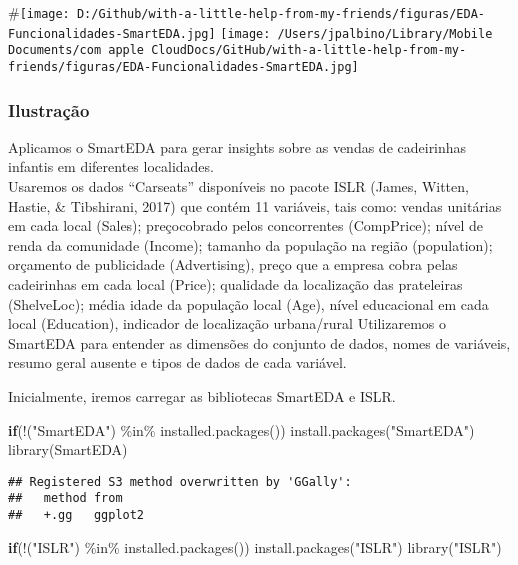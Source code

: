 \documentclass[
]{article}
\newenvironment{Shaded}{\begin{snugshade}}{\end{snugshade}}
\newcommand{\ControlFlowTok}[1]{\textcolor[rgb]{0.13,0.29,0.53}{\textbf{#1}}}
\newcommand{\FunctionTok}[1]{\textcolor[rgb]{0.00,0.00,0.00}{#1}}
\newcommand{\NormalTok}[1]{#1}
\newcommand{\SpecialCharTok}[1]{\textcolor[rgb]{0.00,0.00,0.00}{#1}}
\newcommand{\StringTok}[1]{\textcolor[rgb]{0.31,0.60,0.02}{#1}}
\begin{document}
\#\texttt{[image: D:/Github/with-a-little-help-from-my-friends/figuras/EDA-Funcionalidades-SmartEDA.jpg]}
\texttt{[image: /Users/jpalbino/Library/Mobile Documents/com~apple~CloudDocs/GitHub/with-a-little-help-from-my-friends/figuras/EDA-Funcionalidades-SmartEDA.jpg]}

\hypertarget{ilustrauxe7uxe3o}{%
\subsubsection{Ilustração}\label{ilustrauxe7uxe3o}}

Aplicamos o SmartEDA para gerar insights sobre as vendas de cadeirinhas
infantis em diferentes localidades.\\
Usaremos os dados ``Carseats'' disponíveis no pacote ISLR (James,
Witten, Hastie, \& Tibshirani, 2017) que contém 11 variáveis, tais como:
vendas unitárias em cada local (Sales); preçocobrado pelos concorrentes
(CompPrice); nível de renda da comunidade (Income); tamanho da população
na região (population); orçamento de publicidade (Advertising), preço
que a empresa cobra pelas cadeirinhas em cada local (Price); qualidade
da localização das prateleiras (ShelveLoc); média idade da população
local (Age), nível educacional em cada local (Education), indicador de
localização urbana/rural Utilizaremos o SmartEDA para entender as
dimensões do conjunto de dados, nomes de variáveis, resumo geral ausente
e tipos de dados de cada variável.

Inicialmente, iremos carregar as bibliotecas SmartEDA e ISLR.

\begin{Shaded}
\begin{Highlighting}[]
\ControlFlowTok{if}\NormalTok{(}\SpecialCharTok{!}\NormalTok{(}\StringTok{"SmartEDA"}\NormalTok{) }\SpecialCharTok{\%in\%} \FunctionTok{installed.packages}\NormalTok{()) }\FunctionTok{install.packages}\NormalTok{(}\StringTok{"SmartEDA"}\NormalTok{)}
\FunctionTok{library}\NormalTok{(SmartEDA)}
\end{Highlighting}
\end{Shaded}

\begin{verbatim}
## Registered S3 method overwritten by 'GGally':
##   method from   
##   +.gg   ggplot2
\end{verbatim}

\begin{Shaded}
\begin{Highlighting}[]
\ControlFlowTok{if}\NormalTok{(}\SpecialCharTok{!}\NormalTok{(}\StringTok{"ISLR"}\NormalTok{) }\SpecialCharTok{\%in\%} \FunctionTok{installed.packages}\NormalTok{()) }\FunctionTok{install.packages}\NormalTok{(}\StringTok{"ISLR"}\NormalTok{)}
\FunctionTok{library}\NormalTok{(}\StringTok{"ISLR"}\NormalTok{)}
\end{Highlighting}
\end{Shaded}
\end{document}
